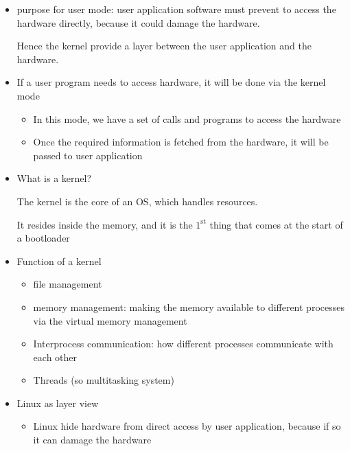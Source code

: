 \documentclass[12pt,a4paper]{book}
\begin{document}
\begin{itemize}

\item purpose for user mode: user application software must prevent to access the hardware directly, because it could damage the hardware.

Hence the kernel provide a layer between the user application and the hardware.

\item If a user program needs to access hardware,  it will be done via the kernel mode

    \begin{itemize}
        \item In this mode, we have a set of calls and programs to access the hardware

        \item Once the required information is fetched from the hardware,  it will be passed to user application
    \end{itemize}

\item What is  a kernel?

The kernel is the core of an OS, which handles resources.

It resides inside the memory, and it is the $\mathrm{1}^\mathrm{st}$ thing that comes at the start of a bootloader


\item Function of a kernel

    \begin{itemize}
    
    \item file management

    \item  memory management: making the memory available to different processes via the virtual memory management


    \item Interprocess communication: how different processes communicate with each other

    \item Threads (so multitasking system)
    \end{itemize}


\item Linux as layer view

\begin{itemize}
    \item Linux hide hardware from direct access by user application, because if so it can damage the hardware


\end{itemize}
\end{itemize}
\end{document}

